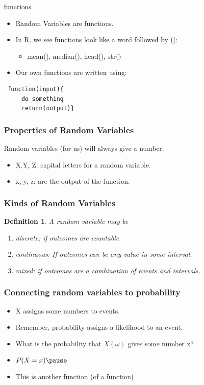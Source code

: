 \documentclass{beamer}
\newtheorem{defn}{Definition}
\numberwithin{equation}{section}
\begin{document}
\begin{frame}[fragile]{functions}
\begin{itemize}
\item Random Variables are functions.
\item In R, we see functions look like a word followed by ():
\begin{itemize}
\item mean(), median(), head(), str()
\end{itemize}
\item Our own functions are written using:
\end{itemize}
 
\begin{verbatim}
 function(input){ 
     do something 
     return(output)}
 \end{verbatim}

\end{frame}

\begin{frame}
\frametitle{Properties of Random Variables}

Random variables (for us) will always give a number.
\begin{itemize}
\item X,Y, Z: capital letters for a random variable.
\item x, y, z: are the output of the function.
\end{itemize}
\end{frame}


\begin{frame}
\frametitle{Kinds of Random Variables}
\begin{defn}
A random variable may be 
\begin{enumerate}
\item discrete: if outcomes are countable.
\item continuous: If outcomes can be any value in some interval.
\item mixed: if outcomes are a combination of events and intervals.
\end{enumerate}
\end{defn}
\end{frame}


\begin{frame}
\frametitle{Connecting random variables to probability}
\begin{itemize}
\item X assigns some numbers to events.\pause
\item Remember, probability assigns a likelihood to an event.\pause
\item What is the probability that $X(\omega)$ gives some number x?\pause
\item $P(X=x)\pause $
\item This is another function (of a function)
\end{itemize}
\end{frame}
\end{document}
